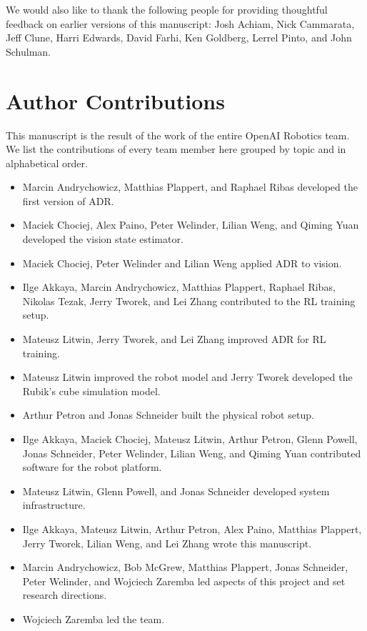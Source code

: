 \documentclass{article}
\begin{document}
We would also like to thank the following people for providing thoughtful feedback on earlier versions of this
manuscript: Josh Achiam, Nick Cammarata, Jeff Clune, Harri Edwards, David Farhi, Ken Goldberg, Lerrel Pinto, and John Schulman.

\section*{Author Contributions}
This manuscript is the result of the work of the entire OpenAI Robotics team. We list the contributions of every team member here grouped by topic and in alphabetical order.

\begin{itemize}
    \item Marcin Andrychowicz, Matthias Plappert, and Raphael Ribas developed the first version of ADR.
    
    \item Maciek Chociej, Alex Paino, Peter Welinder, Lilian Weng, and Qiming Yuan developed the vision state estimator.
    
    \item Maciek Chociej, Peter Welinder and Lilian Weng applied ADR to vision.
    
    \item Ilge Akkaya, Marcin Andrychowicz, Matthias Plappert, Raphael Ribas, Nikolas Tezak, Jerry Tworek, and Lei Zhang contributed to the RL training setup.
    
    \item Mateusz Litwin, Jerry Tworek, and Lei Zhang improved ADR for RL training.
    
    \item Mateusz Litwin improved the robot model and Jerry Tworek developed the Rubik's cube simulation model.
    
    \item Arthur Petron and Jonas Schneider built the physical robot setup.
    
    \item Ilge Akkaya, Maciek Chociej, Mateusz Litwin, Arthur Petron, Glenn Powell, Jonas Schneider, Peter Welinder, Lilian Weng, and Qiming Yuan contributed software for the robot platform.
    
    \item Mateusz Litwin, Glenn Powell, and Jonas Schneider developed system infrastructure.
    
    \item Ilge Akkaya, Mateusz Litwin, Arthur Petron, Alex Paino, Matthias Plappert, Jerry Tworek, Lilian Weng, and Lei Zhang wrote this manuscript.
    
    \item Marcin Andrychowicz, Bob McGrew, Matthias Plappert, Jonas Schneider, Peter Welinder, and Wojciech Zaremba led aspects of this project and set research directions.
    
    \item Wojciech Zaremba led the team.
\end{itemize}




\newpage
\appendix
\appendixpage








\end{document}
